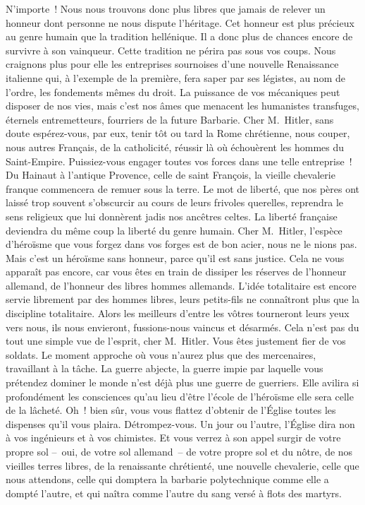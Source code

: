\documentclass[french,twoside]{book} %
\begin{document}
N’importe ! Nous nous trouvons donc plus libres que jamais de relever un honneur dont personne ne nous dispute l’héritage. Cet honneur est plus précieux au genre humain que la tradition hellénique. Il a donc plus de chances encore de survivre à son vainqueur. Cette tradition ne périra pas sous vos coups. Nous craignons plus pour elle les entreprises sournoises d’une nouvelle Renaissance italienne qui, à l’exemple de la première, fera saper par ses légistes, au nom de l’ordre, les fondements mêmes du droit. La puissance de vos mécaniques peut disposer de nos vies, mais c’est nos âmes que menacent les humanistes transfuges, éternels entremetteurs, fourriers de la future Barbarie. Cher M. Hitler, sans doute espérez-vous, par eux, tenir tôt ou tard la Rome chrétienne, nous couper, nous autres Français, de la catholicité, réussir là où échouèrent les hommes du Saint-Empire. Puissiez-vous engager toutes vos forces dans une telle entreprise ! Du Hainaut à l’antique Provence, celle de saint François, la vieille chevalerie franque commencera de remuer sous la terre. Le mot de liberté, que nos pères ont laissé trop souvent s’obscurcir au cours de leurs frivoles querelles, reprendra le sens religieux que lui donnèrent jadis nos ancêtres celtes. La liberté française deviendra du même coup la liberté du genre humain. Cher M. Hitler, l’espèce d’héroïsme que vous forgez dans vos forges est de bon acier, nous ne le nions pas. Mais c’est un héroïsme sans honneur, parce qu’il est sans justice. Cela ne vous apparaît pas encore, car vous êtes en train de dissiper les réserves de l’honneur allemand, de l’honneur des libres hommes allemands. L’idée totalitaire est encore servie librement par des hommes libres, leurs petits-fils ne connaîtront plus que la discipline totalitaire. Alors les meilleurs d’entre les vôtres tourneront leurs yeux vers nous, ils nous envieront, fussions-nous vaincus et désarmés. Cela n’est pas du tout une simple vue de l’esprit, cher M. Hitler. Vous êtes justement fier de vos soldats. Le moment approche où vous n’aurez plus que des mercenaires, travaillant à la tâche. La guerre abjecte, la guerre impie par laquelle vous prétendez dominer le monde n’est déjà plus une guerre de guerriers. Elle avilira si profondément les consciences qu’au lieu d’être l’école de l’héroïsme elle sera celle de la lâcheté. Oh ! bien sûr, vous vous flattez d’obtenir de l’Église toutes les dispenses qu’il vous plaira. Détrompez-vous. Un jour ou l’autre, l’Église dira non à vos ingénieurs et à vos chimistes. Et vous verrez à son appel surgir de votre propre sol – oui, de votre sol allemand – de votre propre sol et du nôtre, de nos vieilles terres libres, de la renaissante chrétienté, une nouvelle chevalerie, celle que nous attendons, celle qui domptera la barbarie polytechnique comme elle a dompté l’autre, et qui naîtra comme l’autre du sang versé à flots des martyrs.\par
\end{document}
